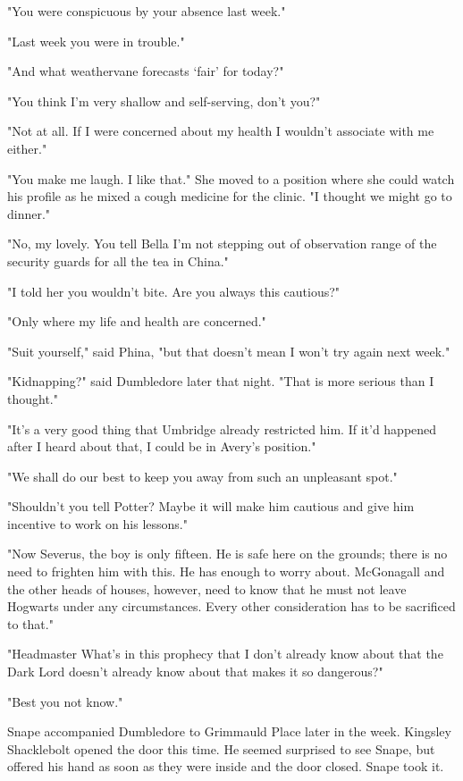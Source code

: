 "You were conspicuous by your absence last week."

"Last week you were in trouble."

"And what weathervane forecasts `fair' for today?"

"You think I'm very shallow and self-serving, don't you?"

"Not at all. If I were concerned about my health I wouldn't associate with me either."

"You make me laugh. I like that." She moved to a position where she could watch his profile as he mixed a cough medicine for the clinic. "I thought we might go to dinner."

"No, my lovely. You tell Bella I'm not stepping out of observation range of the security guards for all the tea in China."

"I told her you wouldn't bite. Are you always this cautious?"

"Only where my life and health are concerned."

"Suit yourself," said Phina, "but that doesn't mean I won't try again next week."

\sbreak

"Kidnapping?" said Dumbledore later that night. "That is more serious than I thought."

"It's a very good thing that Umbridge already restricted him. If it'd happened after I heard about that, I could be in Avery's position."

"We shall do our best to keep you away from such an unpleasant spot."

"Shouldn't you tell Potter? Maybe it will make him cautious and give him incentive to work on his lessons."

"Now Severus, the boy is only fifteen. He is safe here on the grounds; there is no need to frighten him with this. He has enough to worry about. McGonagall and the other heads of houses, however, need to know that he must not leave Hogwarts under any circumstances. Every other consideration has to be sacrificed to that."

"Headmaster{\el} What's in this prophecy that I don't already know about{\el} that the Dark Lord doesn't already know about{\el} that makes it so dangerous?"

"Best you not know."

Snape accompanied Dumbledore to Grimmauld Place later in the week. Kingsley Shacklebolt opened the door this time. He seemed surprised to see Snape, but offered his hand as soon as they were inside and the door closed. Snape took it.

